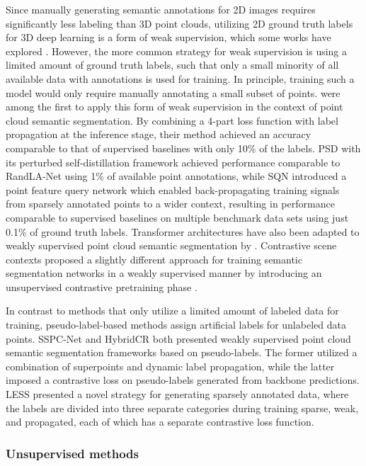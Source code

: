 Since manually generating semantic annotations for 2D images requires significantly less labeling than 3D point clouds, utilizing 2D ground truth labels for 3D deep learning is a form of weak supervision, which some works have explored \citep{wang2019towards,kweon2022joint}. However, the more common strategy for weak supervision is using a limited amount of ground truth labels, such that only a small minority of all available data with annotations is used for training. In principle, training such a model would only require manually annotating a small subset of points. \cite{xu2020weakly} were among the first to apply this form of weak supervision in the context of point cloud semantic segmentation. By combining a 4-part loss function with label propagation at the inference stage, their method achieved an accuracy comparable to that of supervised baselines with only 10\% of the labels. PSD \citep{zhang2021perturbed} with its perturbed self-distillation framework achieved performance comparable to RandLA-Net using 1\% of available point annotations, while SQN \citep{hu2022sqn} introduced a point feature query network which enabled back-propagating training signals from sparsely annotated points to a wider context, resulting in performance comparable to supervised baselines on multiple benchmark data sets using just 0.1\% of ground truth labels. Transformer architectures have also been adapted to weakly supervised point cloud semantic segmentation by \cite{yang2022mil}. Contrastive scene contexts proposed a slightly different approach for training semantic segmentation networks in a weakly supervised manner by introducing an unsupervised contrastive pretraining phase \citep{hou2021exploring}.

In contrast to methods that only utilize a limited amount of labeled data for training, pseudo-label-based methods assign artificial labels for unlabeled data points. SSPC-Net \citep{chen2021sspcnet} and HybridCR \citep{li2022hybridcr} both presented weakly supervised point cloud semantic segmentation frameworks based on pseudo-labels. The former utilized a combination of superpoints and dynamic label propagation, while the latter imposed a contrastive loss on pseudo-labels generated from backbone predictions. LESS \citep{liu2022less} presented a novel strategy for generating sparsely annotated data, where the labels are divided into three separate categories during training sparse, weak, and propagated, each of which has a separate contrastive loss function.

\subsubsection{Unsupervised methods}

